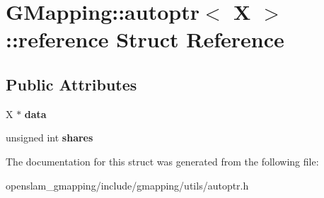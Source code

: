 \hypertarget{structGMapping_1_1autoptr_1_1reference}{}\section{G\+Mapping\+:\+:autoptr$<$ X $>$\+:\+:reference Struct Reference}
\label{structGMapping_1_1autoptr_1_1reference}
\subsection*{Public Attributes}
\begin{DoxyCompactItemize}
\item 
\mbox{\label{structGMapping_1_1autoptr_1_1reference_ad8ef983e1c6a32353f4c32be2bfe3896}} 
X $\ast$ {\bfseries data}
\item 
\mbox{\label{structGMapping_1_1autoptr_1_1reference_ae7e64cc901f97ed951aa38721052f4e7}} 
unsigned int {\bfseries shares}
\end{DoxyCompactItemize}


The documentation for this struct was generated from the following file\+:\begin{DoxyCompactItemize}
\item 
openslam\+\_\+gmapping/include/gmapping/utils/autoptr.\+h\end{DoxyCompactItemize}
